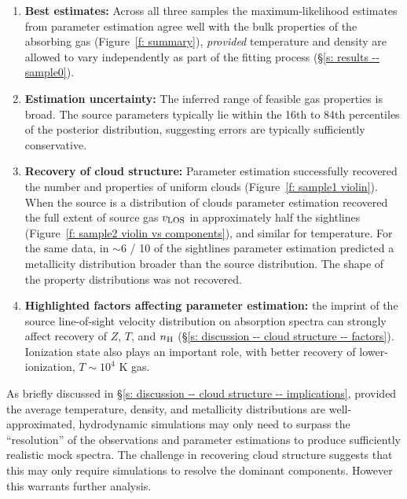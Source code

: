 \documentclass[fleqn,usenatbib]{mnras}
\begin{document}
\begin{enumerate}
    \item \textbf{Best estimates:} Across all three samples the maximum-likelihood estimates from parameter estimation agree well with the bulk properties of the absorbing gas (Figure~\ref{f: summary}), \textit{provided} temperature and density are allowed to vary independently as part of the fitting process (\S\ref{s: results -- sample0}).
    \item \textbf{Estimation uncertainty:} The inferred range of feasible gas properties is broad. The source parameters typically lie within the 16th to 84th percentiles of the posterior distribution, suggesting errors are typically sufficiently conservative.
    \item \textbf{Recovery of cloud structure:} Parameter estimation successfully recovered the number and properties of uniform clouds (Figure~\ref{f: sample1 violin}). When the source is a distribution of clouds parameter estimation recovered the full extent of source gas $v_{\rm LOS}$ in approximately half the sightlines (Figure~\ref{f: sample2 violin vs components}), and similar for temperature. For the same data, in $\sim 6$ / 10 of the sightlines parameter estimation predicted a metallicity distribution broader than the source distribution. The shape of the property distributions was not recovered.
    \item \textbf{Highlighted factors affecting parameter estimation:} the imprint of the source line-of-sight velocity distribution on absorption spectra can strongly affect recovery of $Z$, $T$, and $n_{\rm H}$ (\S\ref{s: discussion -- cloud structure -- factors}). Ionization state also plays an important role, with better recovery of lower-ionization, $T \sim 10^4$ K gas.
\end{enumerate}

As briefly discussed in \S\ref{s: discussion -- cloud structure -- implications},
provided the average temperature, density, and metallicity distributions are well-approximated,
hydrodynamic simulations may only need to surpass the ``resolution'' of the observations and parameter estimations to produce sufficiently realistic mock spectra.
The challenge in recovering cloud structure suggests that this may only require simulations to resolve the dominant components.
However this warrants further analysis.
\end{document}
